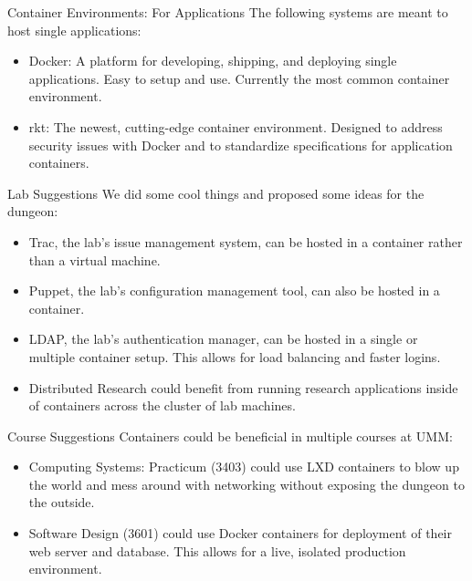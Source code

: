 \documentclass[xcolor=dvipsnames,aspectratio=1610]{beamer}
\begin{document}
  \begin{frame}{Container Environments: For Applications}
      The following systems are meant to host single applications: \newline
      \begin{itemize}
          \setlength\itemsep{1.6em}
          \item \alert{Docker}: A platform for developing, shipping, and deploying single applications. Easy to setup and use. Currently the most common container environment.
          \item \alert{rkt}: The newest, cutting-edge container environment. Designed to address security issues with Docker and to standardize specifications for application containers.
      \end{itemize}
  \end{frame}

  \begin{frame}{Lab Suggestions}
      We did some cool things and proposed some ideas for the dungeon:
      \begin{itemize}
          \item \alert{Trac}, the lab's issue management system, can be hosted in a container rather than a virtual machine.
          \item \alert{Puppet}, the lab's configuration management tool, can also be hosted in a container.
          \item \alert{LDAP}, the lab's authentication manager, can be hosted in a single or multiple container setup. This allows for load balancing and faster logins.
          \item \alert{Distributed Research} could benefit from running research applications inside of containers across the cluster of lab machines.
      \end{itemize}
  \end{frame}

  \begin{frame}{Course Suggestions}
      Containers could be beneficial in multiple courses at UMM:
      \begin{itemize}
          \item \alert{Computing Systems: Practicum} (3403) could use LXD containers to blow up the world and mess around with networking without exposing the dungeon to the outside.
          \item \alert{Software Design} (3601) could use Docker containers for deployment of their web server and database. This allows for a live, isolated production environment.
      \end{itemize}
  \end{frame}
\end{document}
